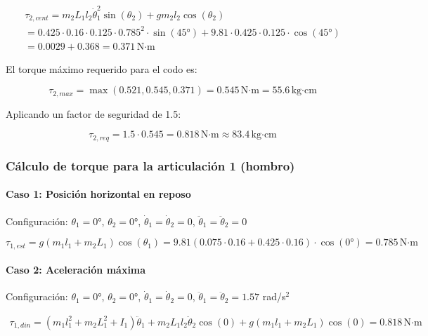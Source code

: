 \begin{multline}
\tau_{2,cent} = m_2L_1l_2\dot{\theta}_1^2\sin(\theta_2) + gm_2l_2\cos(\theta_2) \\
= 0.425 \cdot 0.16 \cdot 0.125 \cdot 0.785^2 \cdot \sin(45°) + 9.81 \cdot 0.425 \cdot 0.125 \cdot \cos(45°) \\
= 0.0029 + 0.368 = 0.371 \, \text{N·m}
\end{multline}

El torque máximo requerido para el codo es:

\begin{equation}
\tau_{2,max} = \max(0.521, 0.545, 0.371) = 0.545 \, \text{N·m} = 55.6 \, \text{kg·cm}
\end{equation}

Aplicando un factor de seguridad de 1.5:

\begin{equation}
\tau_{2,req} = 1.5 \cdot 0.545 = 0.818 \, \text{N·m} \approx 83.4 \, \text{kg·cm}
\end{equation}

\subsubsection{Cálculo de torque para la articulación 1 (hombro)}

\paragraph{Caso 1: Posición horizontal en reposo}

Configuración: $\theta_1 = 0°$, $\theta_2 = 0°$, $\dot{\theta}_1 = \dot{\theta}_2 = 0$, $\ddot{\theta}_1 = \ddot{\theta}_2 = 0$

\begin{equation}
\tau_{1,est} = g(m_1l_1 + m_2L_1)\cos(\theta_1)
= 9.81(0.075 \cdot 0.16 + 0.425 \cdot 0.16) \cdot \cos(0°)
= 0.785 \, \text{N·m}
\end{equation}

\paragraph{Caso 2: Aceleración máxima}

Configuración: $\theta_1 = 0°$, $\theta_2 = 0°$, $\dot{\theta}_1 = \dot{\theta}_2 = 0$, $\ddot{\theta}_1 = \ddot{\theta}_2 = 1.57$ rad/s$^2$

\begin{multline}
\tau_{1,din} = (m_1l_1^2 + m_2L_1^2 + I_1)\ddot{\theta}_1 + m_2L_1l_2\ddot{\theta}_2\cos(0) + g(m_1l_1 + m_2L_1)\cos(0) = 0.818 \, \text{N·m}
\end{multline}

